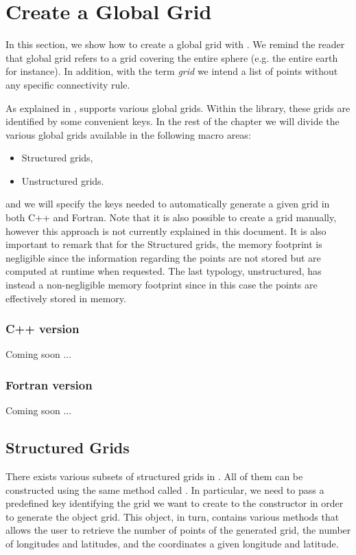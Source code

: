 \chapter{Create a Global Grid}
\label{chap:global-grids}
In this section, we show how to create a global grid with \Atlas.
We remind the reader that global grid refers to a grid covering 
the entire sphere (e.g. the entire earth for instance).
In addition, with the term \textit{grid} we intend a 
list of points without any specific connectivity rule.

As explained in , \Atlas supports various 
global grids. Within the library, these grids are identified 
by some convenient keys. In the rest of the chapter we will 
divide the various global grids available in the following 
macro areas:
%
\begin{itemize}
\item Structured grids,
\item Unstructured grids.
\end{itemize} 
%
and we will specify the keys needed to automatically generate 
a given grid in both C++ and Fortran. Note that it is also possible 
to create a grid manually, however this approach is not currently 
explained in this document.
It is also important to remark that for the Structured grids, the memory
footprint is negligible since the information regarding the points are not 
stored but are computed at runtime when requested.
The last typology, unstructured, has instead a non-negligible memory 
footprint since in this case the points are effectively stored in memory.

\subsection{C++ version}
Coming soon ...

\subsection{Fortran version}
Coming soon ...



\section{Structured Grids}
There exists various subsets of structured grids in \Atlas.
All of them can be constructed using the same method
called . In particular, we need to pass 
a predefined key identifying the grid we want to create 
to the constructor in order to generate the object grid. 
This object, in turn, contains various methods that allows 
the user to retrieve the number of points of the generated 
grid, the number of longitudes and latitudes, and the 
coordinates a given longitude and latitude.

